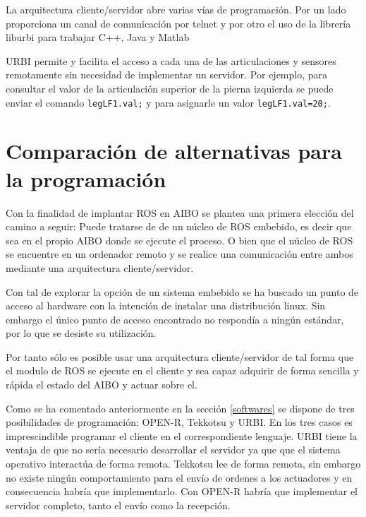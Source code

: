 \documentclass[12pt,a4paper,final,twoside]{book}
\begin{document}
La arquitectura cliente/servidor abre varias vías de programación. Por un lado proporciona un canal de comunicación por telnet y por otro el uso de la librería liburbi para trabajar C++, Java y Matlab

URBI permite y facilita el acceso a cada una de las articulaciones y sensores remotamente sin necesidad de implementar un servidor. Por ejemplo, para consultar el valor de la articulación superior de la pierna izquierda se puede enviar el comando \texttt{legLF1.val;} y para asignarle un valor \texttt{legLF1.val=20;}\cite{urbicmd}.

\clearpage



\chapter{Comparación de alternativas para la programación}\label{seccomp}
\thispagestyle{fancy}

Con la finalidad de implantar ROS en AIBO se plantea una primera elección del camino a seguir: 
Puede tratarse de de un núcleo de ROS embebido, es decir que sea en el propio AIBO donde se ejecute el proceso. O bien que el núcleo de ROS se encuentre en un ordenador remoto y se realice una comunicación entre ambos mediante una arquitectura cliente/servidor.

Con tal de explorar la opción de un sistema embebido se ha buscado un punto de acceso al hardware con la intención de instalar una distribución linux. Sin embargo el único punto de acceso encontrado no respondía a ningún estándar, por lo que se desiste su utilización.


Por tanto sólo es posible usar una arquitectura cliente/servidor de tal forma que el modulo de ROS se ejecute en el cliente y sea capaz adquirir de forma sencilla y rápida el estado del AIBO y actuar sobre el.


Como se ha comentado anteriormente en la sección \ref{softwares} se dispone de tres posibilidades de programación: OPEN-R, Tekkotsu y URBI.
En los tres casos es imprescindible programar el cliente en el correspondiente lenguaje. URBI tiene la ventaja de que no sería necesario desarrollar el servidor ya que que el sistema operativo interactúa de forma remota. Tekkotsu lee de forma remota, sin embargo no existe ningún comportamiento para el envío de ordenes a los actuadores y en consecuencia habría que implementarlo. Con OPEN-R habría que implementar el servidor completo, tanto el envío como la recepción.
\end{document}
